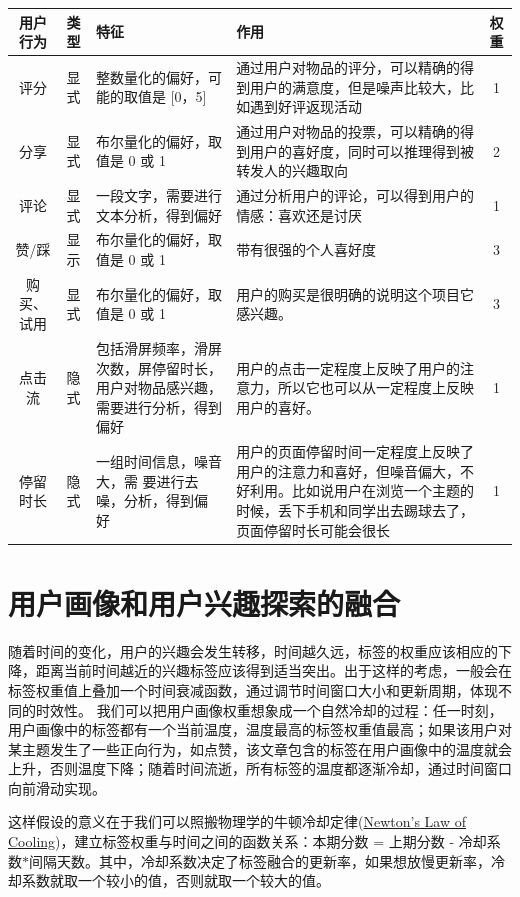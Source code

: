     \begin{table}[htp]
    \centering
    \label{tab:userAction}
    \begin{tabular}{ |c|c|p{4cm}|p{5cm}|c|} \hline
     用户行为 & 类型 & 特征 & 作用 & 权重\\ \hline
     评分 & 显式 & 整数量化的偏好，可能的取值是 [0，5] & 通过用户对物品的评分，可以精确的得到用户的满意度，但是噪声比较大，比如遇到好评返现活动 & 1\\ \hline
     分享 & 显式 & 布尔量化的偏好，取值是 0 或 1 & 通过用户对物品的投票，可以精确的得到用户的喜好度，同时可以推理得到被转发人的兴趣取向 & 2\\ \hline
     评论 & 显式 & 一段文字，需要进行文本分析，得到偏好 & 通过分析用户的评论，可以得到用户的情感：喜欢还是讨厌 & 1\\ \hline
     赞/踩 & 显示 & 布尔量化的偏好，取值是 0 或 1 & 带有很强的个人喜好度 & 3 \\ \hline
     购买、试用 & 显式 & 布尔量化的偏好，取值是 0 或 1 & 用户的购买是很明确的说明这个项目它感兴趣。& 3 \\ \hline
     点击流 & 隐式 & 包括滑屏频率，滑屏次数，屏停留时长，用户对物品感兴趣，需要进行分析，得到偏好 & 用户的点击一定程度上反映了用户的注意力，所以它也可以从一定程度上反映用户的喜好。& 1 \\ \hline
     停留时长 & 隐式 & 一组时间信息，噪音大，需 要进行去噪，分析，得到偏 好 & 用户的页面停留时间一定程度上反映了用户的注意力和喜好，但噪音偏大，不好利用。比如说用户在浏览一个主题的时候，丢下手机和同学出去踢球去了，页面停留时长可能会很长 & 1 \\ \hline
    \end{tabular}
    \end{table}

  \section{用户画像和用户兴趣探索的融合}
  随着时间的变化，用户的兴趣会发生转移，时间越久远，标签的权重应该相应的下降，距离当前时间越近的兴趣标签应该得到适当突出。出于这样的考虑，一般会在标签权重值上叠加一个时间衰减函数，通过调节时间窗口大小和更新周期，体现不同的时效性。
  我们可以把用户画像权重想象成一个自然冷却的过程：任一时刻，用户画像中的标签都有一个当前温度，温度最高的标签权重值最高；如果该用户对某主题发生了一些正向行为，如点赞，该文章包含的标签在用户画像中的温度就会上升，否则温度下降；随着时间流逝，所有标签的温度都逐渐冷却，通过时间窗口向前滑动实现。

  这样假设的意义在于我们可以照搬物理学的牛顿冷却定律(\href{http://www.evanmiller.org/rank-hotness-with-newtons-law-of-cooling.html}{Newton's Law of Cooling})，建立标签权重与时间之间的函数关系：本期分数 = 上期分数 - 冷却系数$*$间隔天数。其中，冷却系数决定了标签融合的更新率，如果想放慢更新率，冷却系数就取一个较小的值，否则就取一个较大的值。


